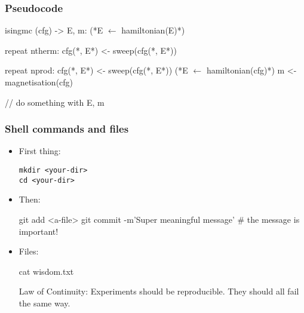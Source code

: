 \documentclass[mathserif, fleqn]{beamer}
\begin{document}
\begin{frame}[fragile]\frametitle{Pseudocode}
  \begin{aiphipseudo}[emph={isingmc}, caption={Some MC pseudocode}]
isingmc (cfg) -> E, m:
    (*\color{aiphigreen}E $\leftarrow$ hamiltonian(E)*)

    repeat ntherm:
        cfg(*\color{aiphigreen}, E*) <- sweep(cfg(*\color{aiphigreen}, E*))

    repeat nprod:
        cfg(*\color{aiphigreen}, E*) <- sweep(cfg(*\color{aiphigreen}, E*))
        (*\color{aiphired}E $\leftarrow$ hamiltonian(cfg)*)
        m <- magnetisation(cfg)

        // do something with E, m
  \end{aiphipseudo}
\end{frame}

\begin{frame}[fragile]\frametitle{Shell commands and files}
  \begin{itemize}
  \item First thing:
    \begin{lstlisting}[language=aiphishell, style=aiphishell]
mkdir <your-dir>
cd <your-dir>
    \end{lstlisting}
  \item Then:
    \begin{aiphishell}
git add <a-file>
git commit -m'Super meaningful message'  # the message is important!
    \end{aiphishell}
  \item Files:
    \begin{aiphishell}
cat wisdom.txt
    \end{aiphishell}
    \begin{aiphifile}
Law of Continuity:
    Experiments should be reproducible.  They should all fail the same way.
    \end{aiphifile}

  \end{itemize}
\end{frame}
\end{document}
